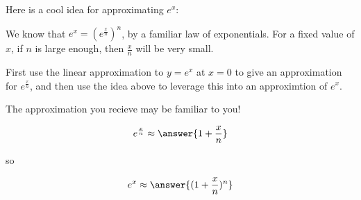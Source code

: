 \documentclass{ximera}
\author{Steven Gubkin}
\begin{document}
\begin{exercise}



Here is a cool idea for approximating $e^x$:

We know that $e^x = \left(e^\frac{x}{n}\right)^n$, by a familiar law of exponentials.  For a fixed value of $x$, if $n$ is large enough, then $\frac{x}{n}$ will be very small.

First use the linear approximation to $y=e^x$ at $x=0$ to give an approximation for $e^\frac{x}{n}$, and then use the idea above to leverage this into an approximtion of $e^x$.

The approximation you recieve may be familiar to you!

\begin{prompt}
$$e^\frac{x}{n} \approx \answer{1+\frac{x}{n}}$$

so

$$
e^x \approx \answer{(1+\frac{x}{n})^n}
$$
\end{prompt}

\end{exercise}
\end{document}
